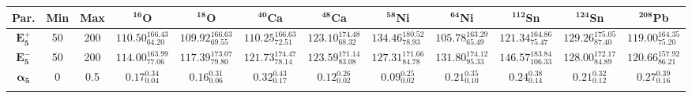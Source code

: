 \bgroup
\def\arraystretch{1.5}%
\begin{tabular}{ c c c c c c c c c c c c} 
\textbf{Par.} & \textbf{Min} & \textbf{Max} & \textbf{$\mathbf{^{16}}$O}& \textbf{$\mathbf{^{18}}$O}& \textbf{$\mathbf{^{40}}$Ca}& \textbf{$\mathbf{^{48}}$Ca}& \textbf{$\mathbf{^{58}}$Ni}& \textbf{$\mathbf{^{64}}$Ni}& \textbf{$\mathbf{^{112}}$Sn}& \textbf{$\mathbf{^{124}}$Sn}& \textbf{$\mathbf{^{208}}$Pb}\\
 \hline 
$\mathbf{E_{5}^{+}}$ & 50 & 200 & $110.50^{166.43}_{64.20}$ & $109.92^{166.63}_{69.55}$ & $110.25^{166.63}_{72.51}$ & $123.10^{174.48}_{68.32}$ & $134.46^{180.52}_{78.93}$ & $105.78^{163.29}_{65.49}$ & $121.34^{164.86}_{75.47}$ & $129.26^{175.05}_{87.40}$ & $119.00^{164.35}_{75.20}$\\ 
$\mathbf{E_{5}^{-}}$ & 50 & 200 & $114.00^{163.99}_{77.06}$ & $117.39^{173.07}_{79.80}$ & $121.73^{174.47}_{78.14}$ & $123.59^{171.14}_{83.08}$ & $127.31^{171.66}_{84.78}$ & $131.80^{174.12}_{95.33}$ & $146.57^{183.84}_{106.33}$ & $128.00^{172.17}_{84.89}$ & $120.66^{157.92}_{86.21}$\\ 
$\mathbf{\alpha_{5}}$ & 0 & 0.5 & $0.17^{0.34}_{0.04}$ & $0.16^{0.31}_{0.06}$ & $0.32^{0.43}_{0.17}$ & $0.12^{0.26}_{0.02}$ & $0.09^{0.25}_{0.02}$ & $0.21^{0.35}_{0.10}$ & $0.24^{0.38}_{0.14}$ & $0.21^{0.32}_{0.12}$ & $0.27^{0.39}_{0.16}$\\ 
\\ 
\end{tabular}
\egroup